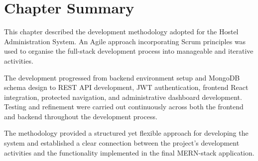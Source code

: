 \section{Chapter Summary}

This chapter described the development methodology adopted for the Hostel Administration System. An Agile approach incorporating Scrum principles was used to organise the full-stack development process into manageable and iterative activities.

The development progressed from backend environment setup and MongoDB schema design to REST API development, JWT authentication, frontend React integration, protected navigation, and administrative dashboard development. Testing and refinement were carried out continuously across both the frontend and backend throughout the development process.

The methodology provided a structured yet flexible approach for developing the system and established a clear connection between the project's development activities and the functionality implemented in the final MERN-stack application.
